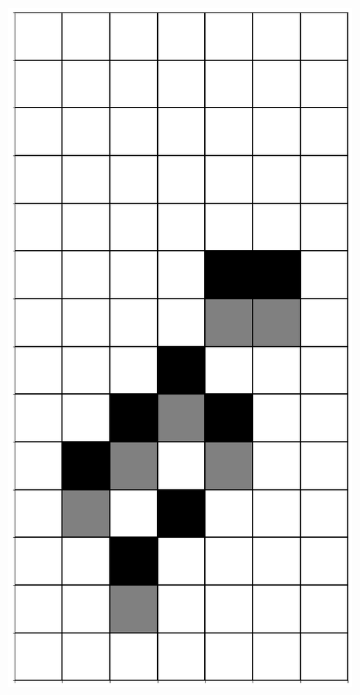 \documentclass[12pt]{article}
\numberwithin{figure}{section} %
\begin{document}
\begin{figure}[H]
    \begin{subfigure}{0.19\textwidth}
     \centering
     \includegraphics[width=\linewidth]{Section4/16.0}
     \subcaption{}
   \end{subfigure}
     \begin{subfigure}{0.19\textwidth}

\end{subfigure}
\end{figure}
\end{document}
